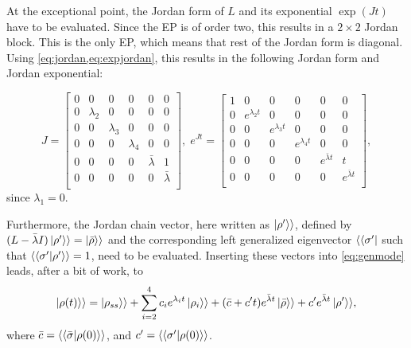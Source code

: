 \documentclass[../main.tex]{subfiles}
\begin{document}
At the exceptional point, the Jordan form of $L$ and its exponential $\exp{(Jt)}$ have to be evaluated. Since the EP is of order two, this results in a $2\times2$ Jordan block. This is the only EP, which means that rest of the Jordan form is diagonal. Using \cref{eq:jordan,eq:expjordan}, this results in the following Jordan form and Jordan exponential:

\begin{equation}
    J = \begin{bmatrix} 0 & 0 & 0 & 0 & 0 & 0 \\
                        0 & \lambda_2 & 0 & 0 & 0 & 0 \\
                        0 & 0 & \lambda_3 & 0 & 0 & 0 \\
                        0 & 0 & 0 & \lambda_4 & 0 & 0 \\
                        0 & 0 & 0 & 0 & \bar \lambda & 1 \\
                        0 & 0 & 0 & 0 & 0 & \bar \lambda \\ \end{bmatrix}, \; 
        e^{Jt} = \begin{bmatrix} 1 & 0 & 0 & 0 & 0 & 0 \\
            0 & e^{\lambda_2t} & 0 & 0 & 0 & 0 \\
            0 & 0 & e^{\lambda_3t} & 0 & 0 & 0 \\
            0 & 0 & 0 & e^{\lambda_4t} & 0 & 0 \\
            0 & 0 & 0 & 0 & e^{\bar \lambda t} & t \\
        0 & 0 & 0 & 0 & 0 & e^{\bar \lambda t} \\ \end{bmatrix},
\end{equation}
since $\lambda_1 = 0$.

Furthermore, the Jordan chain vector, here written as $\ket{\rho'}\rangle$, defined by\\${(L - \bar\lambda I)\ket{\rho'}\rangle = \ket{\bar\rho}\rangle}$ and the corresponding left generalized eigenvector $\langle\bra{\sigma'}$ such that $\langle\braket{\sigma'|\rho'}\rangle = 1$, need to be evaluated. Inserting these vectors into \cref{eq:genmode} leads, after a bit of work, to
\begin{equation}\label{eq:dynep}
    \begin{aligned}
        \ket{\rho(t)}\rangle = \ket{\rho_{ss}}\rangle + \sum_{i=2}^4 c_i e^{\lambda_i t} \ket{\rho_i}\rangle  
                                + (\bar c + c't)e^{\bar \lambda t}\ket{\bar \rho}\rangle + c'e^{\bar\lambda t}\ket{\rho'}\rangle,
    \end{aligned}
\end{equation}
where $\bar c = \langle\braket{\bar\sigma|\rho(0)}\rangle$, and $c' = \langle\braket{\sigma'|\rho(0)}\rangle$.
\end{document}
